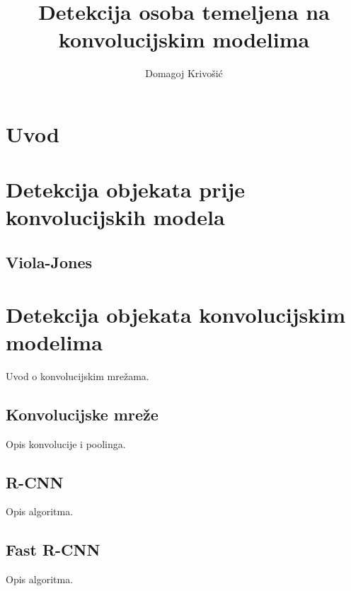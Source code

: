 \documentclass[times, utf8, diplomski]{fer}
\begin{document}

\title{Detekcija osoba temeljena na konvolucijskim modelima}

\author{Domagoj Krivošić}

\maketitle

\izvornik

\zahvala{}

\tableofcontents

\chapter{Uvod}


\chapter{Detekcija objekata prije konvolucijskih modela}


\section{Viola-Jones}


\chapter{Detekcija objekata konvolucijskim modelima}
Uvod o konvolucijskim mrežama.

\section{Konvolucijske mreže}
Opis konvolucije i poolinga.

\section{R-CNN}
Opis algoritma.

\section{Fast R-CNN}
Opis algoritma.
\end{document}
